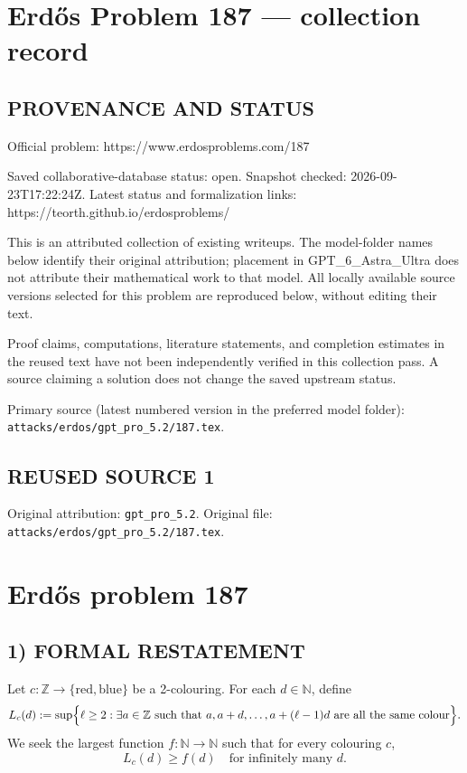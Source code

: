 \section*{Erd\H{o}s Problem 187 --- collection record}

\subsection*{PROVENANCE AND STATUS}
Official problem: https://www.erdosproblems.com/187

Saved collaborative-database status: open.
Snapshot checked: 2026-09-23T17:22:24Z.
Latest status and formalization links: https://teorth.github.io/erdosproblems/

This is an attributed collection of existing writeups. The model-folder names below identify their original attribution; placement in GPT\_6\_Astra\_Ultra does not attribute their mathematical work to that model. All locally available source versions selected for this problem are reproduced below, without editing their text.

Proof claims, computations, literature statements, and completion estimates in the reused text have not been independently verified in this collection pass. A source claiming a solution does not change the saved upstream status.

Primary source (latest numbered version in the preferred model folder): \texttt{attacks/erdos/gpt\_pro\_5.2/187.tex}.

\subsection*{REUSED SOURCE 1}
Original attribution: \texttt{gpt\_pro\_5.2}.
Original file: \texttt{attacks/erdos/gpt\_pro\_5.2/187.tex}.

\section*{Erd\H{o}s problem 187}

\subsection*{1) FORMAL RESTATEMENT}
Let $c:\mathbb{Z}\to\{\text{red},\text{blue}\}$ be a 2-colouring.
For each $d\in\mathbb{N}$, define
\[
L_c(d):=\sup\Bigl\{\ell\ge 2:\exists a\in\mathbb{Z}\ \text{such that } a,a+d,\dots,a+(\ell-1)d\ \text{are all the same colour}\Bigr\}.
\]
We seek the largest function $f:\mathbb{N}\to\mathbb{N}$ such that for every colouring $c$,
\[
L_c(d)\ge f(d)\quad\text{for infinitely many }d.
\]

